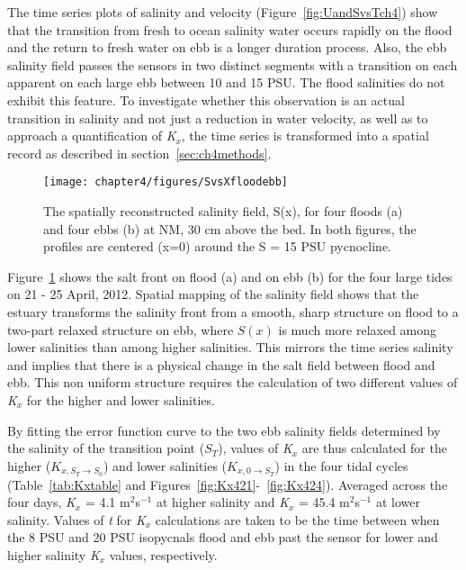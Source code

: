 The time series plots of salinity and velocity (Figure~\ref{fig:UandSvsTch4}) show that the transition from fresh to ocean salinity water occurs rapidly on the flood and the return to fresh water on ebb is a longer duration process. Also, the ebb salinity field passes the sensors in two distinct segments with a transition on each apparent on each large ebb between 10 and 15 PSU. The flood salinities do not exhibit this feature. To investigate whether this observation is an actual transition in salinity and not just a reduction in water velocity, as well as to approach a quantification of \emph{K$_x$}, the time series is transformed into a spatial record as described in section~\ref{sec:ch4methods}. 

\begin{figure}[hp]
	\texttt{[image: chapter4/figures/SvsXfloodebb]} 
\caption{The spatially reconstructed salinity field, S(x), for four floods (a) and four ebbs (b) at NM, 30 cm above the bed. In both figures, the profiles are centered (x=0) around the S = 15 PSU pycnocline.} \label{fig:SvsXall}
\end{figure}

Figure~\ref{fig:SvsXall} shows the salt front on flood (a) and on ebb (b) for the four large tides on 21 - 25 April, 2012. Spatial mapping of the salinity field shows that the estuary transforms  the salinity front from a smooth, sharp structure on flood to a two-part relaxed structure on ebb, where $S(x)$ is much more relaxed among lower salinities than among higher salinities. This mirrors the time series salinity and implies that there is a physical change in the salt field between flood and ebb. This non uniform structure requires the calculation of two different values of \emph{K$_x$} for the higher and lower salinities.

By fitting the error function curve to the two ebb salinity fields determined by the salinity of the transition point ($S_T$), values of \emph{K$_x$} are thus calculated for the higher ($K_{x,S_T\rightarrow S_0}$) and lower salinities ($K_{x,0\rightarrow S_T}$) in the four tidal cycles (Table~\ref{tab:Kxtable} and Figures~\ref{fig:Kx421}-~\ref{fig:Kx424}). Averaged across the four days, \emph{K$_x$} = 4.1 m$^2$s$^{-1}$ at higher salinity and \emph{K$_x$} = 45.4 m$^2$s$^{-1}$ at lower salinity. Values of \emph{t} for \emph{K$_x$} calculations are taken to be the time between when the 8 PSU and 20 PSU isopycnals flood and ebb past the sensor for lower and higher salinity \emph{K$_x$} values, respectively. 

